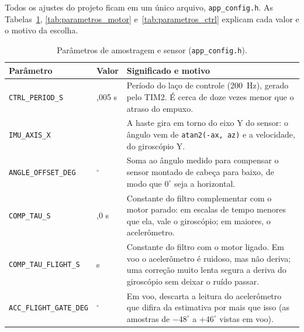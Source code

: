 Todos os ajustes do projeto ficam em um único arquivo, \texttt{app\_config.h}. As Tabelas~\ref{tab:parametros_fw}, \ref{tab:parametros_motor} e~\ref{tab:parametros_ctrl} explicam cada valor e o motivo da escolha.
\begin{table}[H]
\centering\caption{Parâmetros de amostragem e sensor (\texttt{app\_config.h}).}\label{tab:parametros_fw}
\begin{tabularx}{\textwidth}{>{\raggedright\arraybackslash}p{3.7cm}>{\raggedright\arraybackslash}p{2.3cm}X}
\hline\textbf{Parâmetro} & \textbf{Valor} & \textbf{Significado e motivo}\\\hline
\texttt{CTRL\_PERIOD\_S} & 0,005 s & Período do laço de controle (200~Hz), gerado pelo TIM2. É cerca de doze vezes menor que o atraso do empuxo.\\
\texttt{IMU\_AXIS\_X} & 0 & A haste gira em torno do eixo Y do sensor: o ângulo vem de \texttt{atan2(-ax, az)} e a velocidade, do giroscópio Y.\\
\texttt{ANGLE\_OFFSET\_DEG} & 180$^\circ$ & Soma ao ângulo medido para compensar o sensor montado de cabeça para baixo, de modo que $0^\circ$ seja a horizontal.\\
\texttt{COMP\_TAU\_S} & 2,0 s & Constante do filtro complementar com o motor parado: em escalas de tempo menores que ela, vale o giroscópio; em maiores, o acelerômetro.\\
\texttt{COMP\_TAU\_FLIGHT\_S} & 30 s & Constante do filtro com o motor ligado. Em voo o acelerômetro é ruidoso, mas não deriva; uma correção muito lenta segura a deriva do giroscópio sem deixar o ruído passar.\\
\texttt{ACC\_FLIGHT\_GATE\_DEG} & 25$^\circ$ & Em voo, descarta a leitura do acelerômetro que difira da estimativa por mais que isso (as amostras de $-48^\circ$ a $+46^\circ$ vistas em voo).\\
\hline
\end{tabularx}
\end{table}

